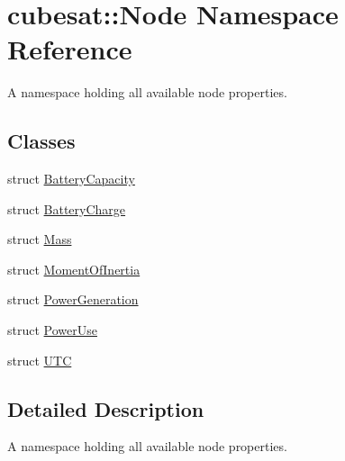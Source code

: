 \hypertarget{namespacecubesat_1_1Node}{}\section{cubesat\+:\+:Node Namespace Reference}
\label{namespacecubesat_1_1Node}


A namespace holding all available node properties.  


\subsection*{Classes}
\begin{DoxyCompactItemize}
\item 
struct \hyperlink{structcubesat_1_1Node_1_1BatteryCapacity}{Battery\+Capacity}
\item 
struct \hyperlink{structcubesat_1_1Node_1_1BatteryCharge}{Battery\+Charge}
\item 
struct \hyperlink{structcubesat_1_1Node_1_1Mass}{Mass}
\item 
struct \hyperlink{structcubesat_1_1Node_1_1MomentOfInertia}{Moment\+Of\+Inertia}
\item 
struct \hyperlink{structcubesat_1_1Node_1_1PowerGeneration}{Power\+Generation}
\item 
struct \hyperlink{structcubesat_1_1Node_1_1PowerUse}{Power\+Use}
\item 
struct \hyperlink{structcubesat_1_1Node_1_1UTC}{U\+TC}
\end{DoxyCompactItemize}


\subsection{Detailed Description}
A namespace holding all available node properties. 